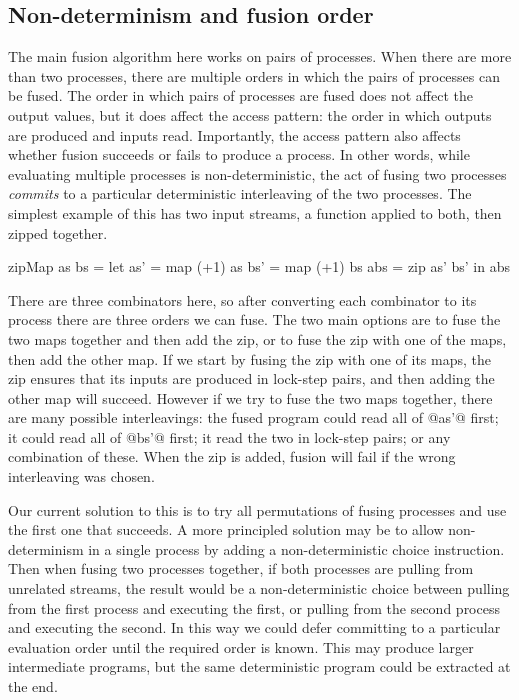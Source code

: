 \subsection{Non-determinism and fusion order}
\label{s:FusionOrder}

The main fusion algorithm here works on pairs of processes.
When there are more than two processes, there are multiple orders in which the pairs of processes can be fused.
The order in which pairs of processes are fused does not affect the output values, but it does affect the access pattern: the order in which outputs are produced and inputs read.
Importantly, the access pattern also affects whether fusion succeeds or fails to produce a process.
In other words, while evaluating multiple processes is non-deterministic, the act of fusing two processes \emph{commits} to a particular deterministic interleaving of the two processes.
The simplest example of this has two input streams, a function applied to both, then zipped together. 

\begin{code}
zipMap as bs =
  let as' = map (+1) as
      bs' = map (+1) bs
      abs = zip as' bs'
  in  abs
\end{code}

There are three combinators here, so after converting each combinator to its process there are three orders we can fuse.
The two main options are to fuse the two maps together and then add the zip, or to fuse the zip with one of the maps, then add the other map.
If we start by fusing the zip with one of its maps, the zip ensures that its inputs are produced in lock-step pairs, and then adding the other map will succeed.
However if we try to fuse the two maps together, there are many possible interleavings: the fused program could read all of @as'@ first; it could read all of @bs'@ first; it read the two in lock-step pairs; or any combination of these.
When the zip is added, fusion will fail if the wrong interleaving was chosen.

% 

Our current solution to this is to try all permutations of fusing processes and use the first one that succeeds.
A more principled solution may be to allow non-determinism in a single process by adding a non-deterministic choice instruction.
Then when fusing two processes together, if both processes are pulling from unrelated streams, the result would be a non-deterministic choice between pulling from the first process and executing the first, or pulling from the second process and executing the second.
In this way we could defer committing to a particular evaluation order until the required order is known.
This may produce larger intermediate programs, but the same deterministic program could be extracted at the end.

